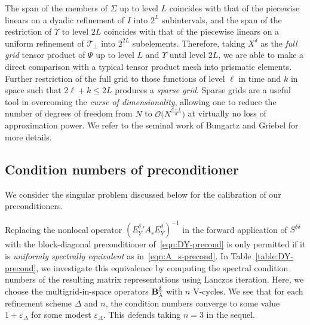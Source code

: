 \documentclass[11pt,a4paper,oneside,english]{amsart}
\numberwithin{equation}{section}
\numberwithin{theorem}{section}
\theoremstyle{definition}
\newcommand{\eps}{\varepsilon}
\newcommand{\T}{\mathcal{T}}
\newcommand{\udelta}{{\underline{\delta}}}
\newcommand{\jw}[1]{{\color{red}{JW: #1}}}
\begin{document}
The span of the members of $\Sigma$ up to level $L$ coincides with that of the
piecewise linears on a dyadic refinement of $I$ into $2^L$ subintervals, and the
span of the restriction of $\Upsilon$ to level $2L$ coincides with that of the
piecewise linears on a uniform refinement of $\T_\perp$ into $2^{2L}$ subelements.
Therefore, taking $X^\delta$ as the \emph{full grid} tensor product of $\Psi$ up to
level $L$ and $\Upsilon$ until level $2L$, we are able to make a direct comparison
with a typical tensor product mesh into prismatic elements. \jw{meh slecht geformuleerd}
Further restriction of the full grid to those functions of level $\ell$ in time and
$k$ in space such that $2 \ell + k \leq 2L$ produces a \emph{sparse grid}.
Sparse grids are a useful tool in overcoming the \emph{curse of dimensionality},
allowing one to reduce the number of degrees of freedom from $N$ to $\mathcal O\big(N^{\tfrac{d-1}{d}}\big)$
at virtually no loss of approximation power. We refer to the seminal work of Bungartz
and Griebel \cite{Bungartz2004} for more details.

\jw{ik mis nog een paar rake zinnen om te vergelijken met FK19 hieronder. De moeilijkheid
zit 'm in het verschil in norm + dat zelfs hun uniform-refinement solutions tov
een simplicial mesh zijn, en wij dus een tensor mesh hebben}

\subsection{Condition numbers of preconditioner}
We consider the singular problem discussed below for the calibration of our preconditioners.

Replacing the nonlocal operator $({E_Y^\udelta}' A_s E_Y^\udelta)^{-1}$ in the
forward application of $S^{\udelta \delta}$ with the block-diagonal preconditioner
of~\eqref{eqn:DY-precond} is only permitted if it is \emph{uniformly spectrally equivalent}
as in~\eqref{eqn:A_s-precond}. In Table~\ref{table:DY-precond}, we investigate
this equivalence by computing the spectral condition numbers of the resulting
matrix representations using Lanczos iteration. Here, we choose the multigrid-in-space
operators ${\bf B}_\lambda^\udelta$ with $n$ V-cycles.\jw{slechte bewoording}
We see that for each refinement scheme $\Delta$ and $n$, the condition numbers
converge to some value $1 + \eps_\Delta$ for some modest $\eps_\Delta$. This defends
taking $n=3$ in the sequel.
\end{document}
